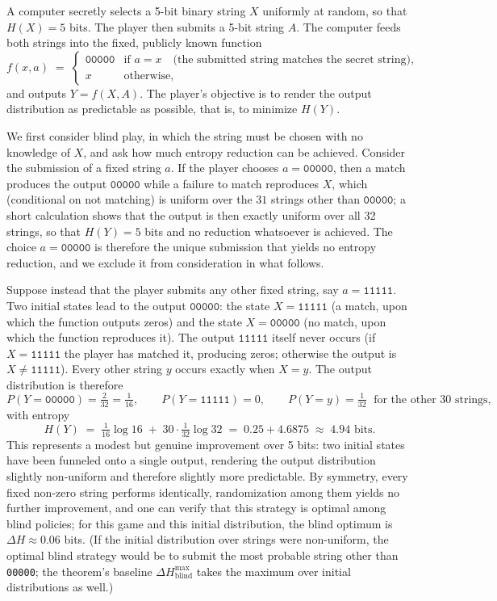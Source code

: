 \documentclass[10pt]{article}
\theoremstyle{definition}
\theoremstyle{remark}
\begin{document}
A computer secretly selects a 5-bit binary string $X$ uniformly at random, so that $H(X) = 5$ bits. The player then submits a 5-bit string $A$. The computer feeds both strings into the fixed, publicly known function
\[
f(x, a) \;=\;
\begin{cases}
\texttt{00000} & \text{if } a = x \quad \text{(the submitted string matches the secret string)},\\[2pt]
x & \text{otherwise},
\end{cases}
\]
and outputs $Y = f(X, A)$. The player's objective is to render the output distribution as predictable as possible, that is, to minimize $H(Y)$.

We first consider blind play, in which the string must be chosen with no knowledge of $X$, and ask how much entropy reduction can be achieved. Consider the submission of a fixed string $a$. If the player chooses $a = \texttt{00000}$, then a match produces the output $\texttt{00000}$ while a failure to match reproduces $X$, which (conditional on not matching) is uniform over the $31$ strings other than $\texttt{00000}$; a short calculation shows that the output is then exactly uniform over all 32 strings, so that $H(Y) = 5$ bits and no reduction whatsoever is achieved. The choice $a = \texttt{00000}$ is therefore the unique submission that yields no entropy reduction, and we exclude it from consideration in what follows.

Suppose instead that the player submits any other fixed string, say $a = \texttt{11111}$. Two initial states lead to the output $\texttt{00000}$: the state $X = \texttt{11111}$ (a match, upon which the function outputs zeros) and the state $X = \texttt{00000}$ (no match, upon which the function reproduces it). The output $\texttt{11111}$ itself never occurs (if $X = \texttt{11111}$ the player has matched it, producing zeros; otherwise the output is $X \ne \texttt{11111}$). Every other string $y$ occurs exactly when $X = y$. The output distribution is therefore
\[
P(Y = \texttt{00000}) = \tfrac{2}{32} = \tfrac1{16}, \qquad
P(Y = \texttt{11111}) = 0, \qquad
P(Y = y) = \tfrac1{32} \;\text{ for the other 30 strings},
\]
with entropy
\[
H(Y) \;=\; \tfrac{1}{16}\log 16 \;+\; 30 \cdot \tfrac{1}{32} \log 32 \;=\; 0.25 + 4.6875 \;\approx\; 4.94 \text{ bits}.
\]
This represents a modest but genuine improvement over 5 bits: two initial states have been funneled onto a single output, rendering the output distribution slightly non-uniform and therefore slightly more predictable. By symmetry, every fixed non-zero string performs identically, randomization among them yields no further improvement, and one can verify that this strategy is optimal among blind policies; for this game and this initial distribution, the blind optimum is $\Delta H \approx 0.06$ bits. (If the initial distribution over strings were non-uniform, the optimal blind strategy would be to submit the most probable string other than \texttt{00000}; the theorem's baseline $\Delta H^{\max}_{\text{blind}}$ takes the maximum over initial distributions as well.)
\end{document}
